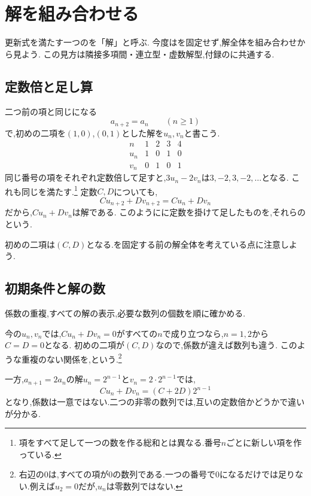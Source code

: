 
\section{解を組み合わせる}\label{節：解を組み合わせる見方}
  更新式を満たす一つのを「解」と呼ぶ.
  今度はを固定せず,解全体を組み合わせから見よう.
  この見方は隣接多項間・連立型・虚数解型,付録のに共通する.

  \subsection{定数倍と足し算}\label{節：線形結合}
    二つ前の項と同じになる
    \[
      a_{n+2}=a_n\qquad(n\ge1)
    \]
    で,初めの二項を$(1,0)$,$(0,1)$とした解を$u_n,v_n$と書こう.
    \[
      \begin{array}{c|rrrr}
        n&1&2&3&4\\ \hline
        u_n&1&0&1&0\\
        v_n&0&1&0&1
      \end{array}
    \]
    同じ番号の項をそれぞれ定数倍して足すと,$3u_n-2v_n$は$3,-2,3,-2,\ldots$となる.
    これも同じを満たす.\footnote{項をすべて足して一つの数を作る総和とは異なる.番号$n$ごとに新しい項を作っている.}
    定数$C,D$についても,
    \[
      Cu_{n+2}+Dv_{n+2}=Cu_n+Dv_n
    \]
    だから,$Cu_n+Dv_n$は解である.
    このようにに定数を掛けて足したものを,それらの\textbf{}という.

    初めの二項は$(C,D)$となる.を固定する前の解全体を考えている点に注意しよう.

  \subsection{初期条件と解の数}\label{節：一次独立・基底・次元}
    係数の重複,すべての解の表示,必要な数列の個数を順に確かめる.

    今の$u_n,v_n$では,$Cu_n+Dv_n=0$がすべての$n$で成り立つなら,$n=1,2$から$C=D=0$となる.
    初めの二項が$(C,D)$なので,係数が違えば数列も違う.
    このような重複のない関係を,\textbf{}という.\footnote{右辺の$0$は,すべての項が$0$の数列である.一つの番号で$0$になるだけでは足りない.例えば$u_2=0$だが,$u_n$は零数列ではない.}

    一方,$a_{n+1}=2a_n$の解$u_n=2^{n-1}$と$v_n=2\cdot2^{n-1}$では,
    \[
      Cu_n+Dv_n=(C+2D)2^{n-1}
    \]
    となり,係数は一意ではない.二つの非零の数列では,互いの定数倍かどうかで違いが分かる.

